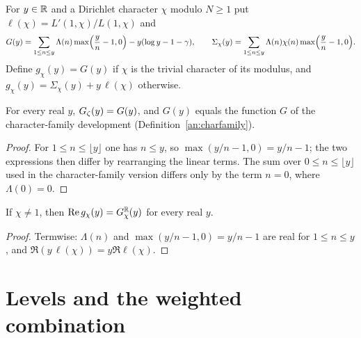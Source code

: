 \begin{definition}\label{an:gchi}
For $y\in\mathbb{R}$ and a Dirichlet character $\chi$ modulo $N\ge1$ put
$\ell(\chi)=L'(1,\chi)/L(1,\chi)$ and
\[
G(y)=\sum_{1\le n\le y}\Lambda(n)\max\Bigl(\frac yn-1,0\Bigr)-y(\log y-1-\gamma),
\qquad
\Sigma_{\chi}(y)=\sum_{1\le n\le y}\Lambda(n)\chi(n)\max\Bigl(\frac yn-1,0\Bigr).
\]
Define $g_{\chi}(y)=G(y)$ if $\chi$ is the trivial character of its modulus,
and $g_{\chi}(y)=\Sigma_{\chi}(y)+y\,\ell(\chi)$ otherwise.
\end{definition}

\begin{lemma}\label{an:gz-eq}
For every real $y$, $G_{\zeta}(y)=G(y)$, and $G(y)$ equals the function $G$ of
the character-family development (Definition~\ref{an:charfamily}).
\end{lemma}
\begin{proof}
For $1\le n\le\lfloor y\rfloor$ one has $n\le y$, so
$\max(y/n-1,0)=y/n-1$; the two expressions then differ by rearranging the
linear terms. The sum over $0\le n\le\lfloor y\rfloor$ used in the
character-family version differs only by the term $n=0$, where
$\Lambda(0)=0$.
\end{proof}

\begin{lemma}\label{an:re-gchi}
If $\chi\ne1$, then $\operatorname{Re} g_{\chi}(y)=G^{\mathbb{R}}_{\chi}(y)$ for every real $y$.
\end{lemma}
\begin{proof}
Termwise: $\Lambda(n)$ and $\max(y/n-1,0)=y/n-1$ are real for
$1\le n\le y$, and $\Re(y\,\ell(\chi))=y\Re\ell(\chi)$.
\end{proof}

\section{Levels and the weighted combination}

